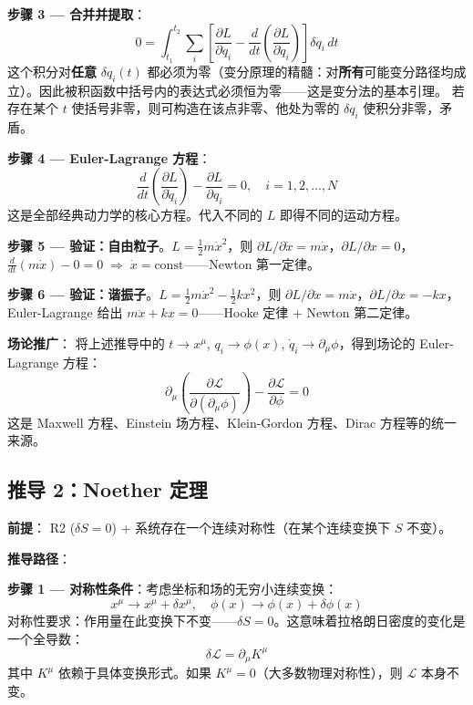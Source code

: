 \textbf{步骤 3 — 合并并提取}：
\begin{equation}
0 = \int_{t_1}^{t_2} \sum_i \left[
\frac{\partial L}{\partial q_i} - \frac{d}{dt}\!\left(\frac{\partial L}{\partial \dot{q}_i}\right)
\right] \delta q_i\, dt
\end{equation}
\fbox{[N]} 这个积分对\textbf{任意} $\delta q_i(t)$ 都必须为零（变分原理的精髓：对\textbf{所有}可能变分路径均成立）。因此被积函数中括号内的表达式必须恒为零——这是变分法的基本引理。\fbox{[S]} 若存在某个 $t$ 使括号非零，则可构造在该点非零、他处为零的 $\delta q_i$ 使积分非零，矛盾。

\textbf{步骤 4 — Euler-Lagrange 方程}：
\begin{equation}
\boxed{\frac{d}{dt}\!\left(\frac{\partial L}{\partial \dot{q}_i}\right) - \frac{\partial L}{\partial q_i} = 0, \quad i = 1,2,\dots,N}
\end{equation}
\fbox{[S]} 这是全部经典动力学的核心方程。代入不同的 $L$ 即得不同的运动方程。

\textbf{步骤 5 — 验证：自由粒子}。$L = \frac{1}{2}m\dot{x}^2$，则 $\partial L/\partial \dot{x} = m\dot{x}$，$\partial L/\partial x = 0$，$\frac{d}{dt}(m\dot{x}) - 0 = 0 \;\Rightarrow\; \dot{x} = \text{const}$——Newton 第一定律。

\textbf{步骤 6 — 验证：谐振子}。$L = \frac{1}{2}m\dot{x}^2 - \frac{1}{2}kx^2$，则 $\partial L/\partial \dot{x} = m\dot{x}$，$\partial L/\partial x = -kx$，Euler-Lagrange 给出 $m\ddot{x} + kx = 0$——Hooke 定律 + Newton 第二定律。

\textbf{场论推广}：\fbox{[S]} 将上述推导中的 $t \to x^\mu$, $q_i \to \phi(x)$, $\dot{q}_i \to \partial_\mu\phi$，得到场论的 Euler-Lagrange 方程：
\begin{equation}
\boxed{\partial_\mu\!\left(\frac{\partial \mathcal{L}}{\partial(\partial_\mu\phi)}\right) - \frac{\partial \mathcal{L}}{\partial \phi} = 0}
\end{equation}
这是 Maxwell 方程、Einstein 场方程、Klein-Gordon 方程、Dirac 方程等的统一来源。

\subsection{推导 2：Noether 定理}

\textbf{前提}：\fbox{[N]} R2 ($\delta S = 0$) + 系统存在一个连续对称性（在某个连续变换下 $S$ 不变）。

\textbf{推导路径}：

\textbf{步骤 1 — 对称性条件}：考虑坐标和场的无穷小连续变换：
\begin{equation}
x^\mu \to x^\mu + \delta x^\mu, \quad \phi(x) \to \phi(x) + \delta\phi(x)
\end{equation}
\fbox{[N]} 对称性要求：作用量在此变换下不变——$\delta S = 0$。这意味着拉格朗日密度的变化是一个全导数：
\begin{equation}
\delta\mathcal{L} = \partial_\mu K^\mu
\end{equation}
其中 $K^\mu$ 依赖于具体变换形式。如果 $K^\mu = 0$（大多数物理对称性），则 $\mathcal{L}$ 本身不变。


